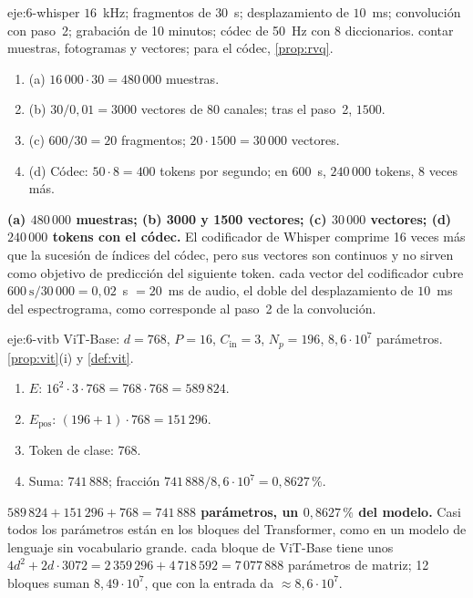 \begin{solucion}{eje:6-whisper}
\datos $16$~kHz; fragmentos de $30$~s; desplazamiento de $10$~ms; convolución con paso~2; grabación de 10 minutos; códec de 50~Hz con 8 diccionarios.
\planteamiento contar muestras, fotogramas y vectores; para el códec, \cref{prop:rvq}.
\pasos
\begin{enumerate}[label=\arabic*.]
  \item (a) $16\,000\cdot 30=480\,000$ muestras.
  \item (b) $30/0{,}01=3000$ vectores de 80 canales; tras el paso~2, $1500$.
  \item (c) $600/30=20$ fragmentos; $20\cdot 1500=30\,000$ vectores.
  \item (d) Códec: $50\cdot 8=400$ tokens por segundo; en 600~s, $240\,000$ tokens, 8 veces más.
\end{enumerate}
\resultado \textbf{(a) $480\,000$ muestras; (b) 3000 y 1500 vectores; (c) $30\,000$ vectores; (d) $240\,000$ tokens con el códec.} El codificador de Whisper comprime 16 veces más que la sucesión de índices del códec, pero sus vectores son continuos y no sirven como objetivo de predicción del siguiente token.
\comprobacion cada vector del codificador cubre $600~\mathrm{s}/30\,000=0{,}02$~s $=20$~ms de audio, el doble del desplazamiento de $10$~ms del espectrograma, como corresponde al paso~2 de la convolución.
\end{solucion}

\begin{solucion}{eje:6-vitb}
\datos ViT-Base: $d=768$, $P=16$, $C_{\mathrm{in}}=3$, $N_p=196$, $8{,}6\cdot 10^{7}$ parámetros.
\planteamiento \cref{prop:vit}(i) y \cref{def:vit}.
\pasos
\begin{enumerate}[label=\arabic*.]
  \item $E$: $16^{2}\cdot 3\cdot 768=768\cdot 768=589\,824$.
  \item $E_{\mathrm{pos}}$: $(196+1)\cdot 768=151\,296$.
  \item Token de clase: $768$.
  \item Suma: $741\,888$; fracción $741\,888/8{,}6\cdot 10^{7}=0{,}8627\,\%$.
\end{enumerate}
\resultado \textbf{$589\,824+151\,296+768=741\,888$ parámetros, un $0{,}8627\,\%$ del modelo.} Casi todos los parámetros están en los bloques del Transformer, como en un modelo de lenguaje sin vocabulario grande.
\comprobacion cada bloque de ViT-Base tiene unos $4d^{2}+2d\cdot 3072=2\,359\,296+4\,718\,592=7\,077\,888$ parámetros de matriz; 12 bloques suman $8{,}49\cdot 10^{7}$, que con la entrada da $\approx 8{,}6\cdot 10^{7}$.
\end{solucion}

